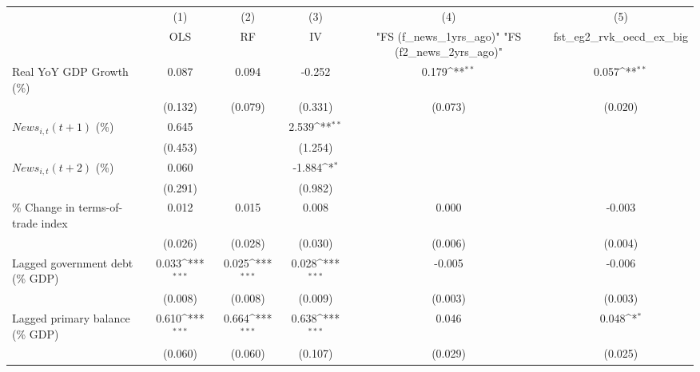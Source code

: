 {
\def\sym#1{\ifmmode^{#1}\else\(^{#1}\)\fi}
\begin{tabular}{l*{5}{c}}
\toprule
                    &\multicolumn{1}{c}{(1)}&\multicolumn{1}{c}{(2)}&\multicolumn{1}{c}{(3)}&\multicolumn{1}{c}{(4)}&\multicolumn{1}{c}{(5)}\\
                    &\multicolumn{1}{c}{OLS}&\multicolumn{1}{c}{RF}&\multicolumn{1}{c}{IV}&\multicolumn{1}{c}{ "FS (f_news_1yrs_ago)"  "FS (f2_news_2yrs_ago)" }&\multicolumn{1}{c}{fst_eg2_rvk_oecd_ex_big}\\
\midrule
Real YoY GDP Growth (\%)&       0.087         &       0.094         &      -0.252         &       0.179\sym{**} &       0.057\sym{**} \\
                    &     (0.132)         &     (0.079)         &     (0.331)         &     (0.073)         &     (0.020)         \\
\addlinespace
$ News_{i,t}(t+1)$ (\%)&       0.645         &                     &       2.539\sym{**} &                     &                     \\
                    &     (0.453)         &                     &     (1.254)         &                     &                     \\
\addlinespace
$ News_{i,t}(t+2)$ (\%)&       0.060         &                     &      -1.884\sym{*}  &                     &                     \\
                    &     (0.291)         &                     &     (0.982)         &                     &                     \\
\addlinespace
\% Change in terms-of-trade index&       0.012         &       0.015         &       0.008         &       0.000         &      -0.003         \\
                    &     (0.026)         &     (0.028)         &     (0.030)         &     (0.006)         &     (0.004)         \\
\addlinespace
Lagged government debt (\% GDP)&       0.033\sym{***}&       0.025\sym{***}&       0.028\sym{***}&      -0.005         &      -0.006         \\
                    &     (0.008)         &     (0.008)         &     (0.009)         &     (0.003)         &     (0.003)         \\
\addlinespace
Lagged primary balance (\% GDP)&       0.610\sym{***}&       0.664\sym{***}&       0.638\sym{***}&       0.046         &       0.048\sym{*}  \\
                    &     (0.060)         &     (0.060)         &     (0.107)         &     (0.029)         &     (0.025)         \\

\end{tabular}}
